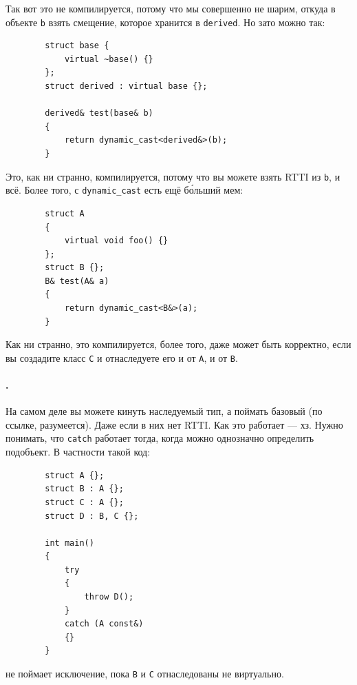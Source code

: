 \documentclass{article}
\begin{document}
    Так вот это не компилируется, потому что мы совершенно не шарим, откуда в объекте \texttt{b} взять смещение, которое хранится в \texttt{derived}. Но зато можно так:
    \begin{verbatim}
        struct base {
            virtual ~base() {}
        };
        struct derived : virtual base {};

        derived& test(base& b)
        {
            return dynamic_cast<derived&>(b);
        }
    \end{verbatim}
    Это, как ни странно, компилируется, потому что вы можете взять RTTI из \texttt{b}, и всё. Более того, с \texttt{dynamic_cast} есть ещё б\'{о}льший мем:
    \begin{verbatim}
        struct A
        {
            virtual void foo() {}
        };
        struct B {};
        B& test(A& a)
        {
            return dynamic_cast<B&>(a);
        }
    \end{verbatim}
    Как ни странно, это компилируется, более того, даже может быть корректно, если вы создадите класс \texttt{C} и отнаследуете его и от \texttt{A}, и от \texttt{B}.
    \paragraph{.}
    На самом деле вы можете кинуть наследуемый тип, а поймать базовый (по ссылке, разумеется). Даже если в них нет RTTI. Как это работает --- хз. Нужно понимать, что \texttt{catch} работает тогда, когда можно однозначно определить подобъект. В частности такой код:
    \begin{verbatim}
        struct A {};
        struct B : A {};
        struct C : A {};
        struct D : B, C {};

        int main()
        {
            try
            {
                throw D();
            }
            catch (A const&)
            {}
        }
    \end{verbatim}
    не поймает исключение, пока \texttt{B} и \texttt{C} отнаследованы не виртуально.
\end{document}
